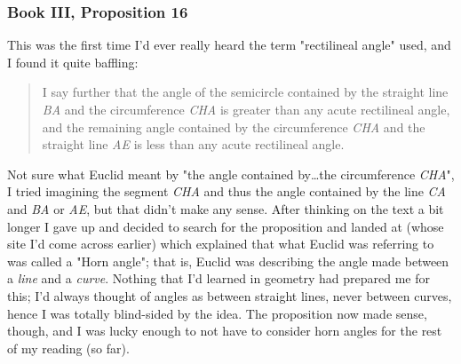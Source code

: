 \documentclass{article}
\begin{document}
\subsubsection{Book III, Proposition 16}
This was the first time I'd ever really heard the term "rectilineal angle" used, and I found it quite baffling:
\begin{center}
\begin{figure}
\begin{makeimage}
\end{makeimage}
\end{figure}
\end{center}
\begin{quote}
I say further that the angle of the semicircle contained by the straight line \textit{BA} and the circumference \textit{CHA} is greater than any acute rectilineal angle, and the remaining angle contained by the circumference \textit{CHA} and the straight line \textit{AE} is less than any acute rectilineal angle.
\end{quote}

Not sure what Euclid meant by "the angle contained by\ldots the circumference \textit{CHA}", I tried imagining the segment \textit{CHA} and thus the angle contained by the line \textit{CA} and \textit{BA} or \textit{AE}, but that didn't make any sense.  After thinking on the text a bit longer I gave up and decided to search for the proposition and landed at  (whose site I'd come across earlier) which explained that what Euclid was referring to was called a "Horn angle"; that is, Euclid was describing the angle made between a \emph{line} and a \emph{curve}.  Nothing that I'd learned in geometry had prepared me for this; I'd always thought of angles as between straight lines, never between curves, hence I was totally blind-sided by the idea.  The proposition now made sense, though, and I was lucky enough to not have to consider horn angles for the rest of my reading (so far).
\end{document}
